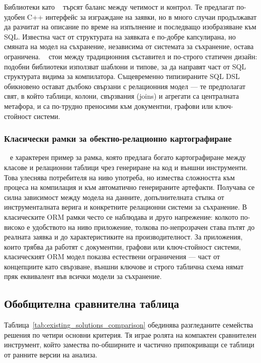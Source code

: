 Библиотеки като ~\cite{soci} търсят баланс между четимост и контрол. Те предлагат по-удобен C++ интерфейс за изграждане на заявки, но в много случаи продължават да разчитат на описание по време на изпълнение и последващо изобразяване към SQL. Известна част от структурата на заявката е по-добре капсулирана, но смяната на модел на съхранение, независима от системата за съхранение, остава ограничена. ~\cite{sqlpp11} стои между традиционния съставител и по-строго статичен дизайн: подобни библиотеки използват шаблони и типове, за да направят част от SQL структурата видима за компилатора. Същевременно типизираните SQL DSL обикновено остават дълбоко свързани с релационния модел --- те предполагат свят, в който таблици, колони, свързвания (joins) и агрегати са централната метафора, и са по-трудно преносими към документни, графови или ключ-стойност системи.

\subsubsection{Класически рамки за обектно-релационно картографиране}

~\cite{odb} е характерен пример за рамка, която предлага богато картографиране между класове и релационни таблици чрез генериране на код и външни инструменти. Това улеснява потребителя на ниво употреба, но измества сложността към процеса на компилация и към автоматично генерираните артефакти. Получава се силна зависимост между модела на данните, допълнителната стъпка от инструменталната верига и конкретните релационни системи за съхранение. В класическите ORM рамки често се наблюдава и друго напрежение: колкото по-високо е удобството на ниво приложение, толкова по-непрозрачен става пътят до реалната заявка и до характеристиките на производителност. За приложения, които трябва да работят с документни, графови или ключ-стойност системи, класическият ORM модел показва естествени ограничения --- част от концепциите като свързване, външни ключове и строго таблична схема нямат пряк еквивалент във всички модели за съхранение.

\subsection{Обобщителна сравнителна таблица}

Таблица~\ref{tab:existing_solutions_comparison} обединява разгледаните семейства решения по четири основни критерия. Тя играе ролята на компактен сравнителен инструмент, който замества по-обширните и частично припокриващи се таблици от ранните версии на анализа.

